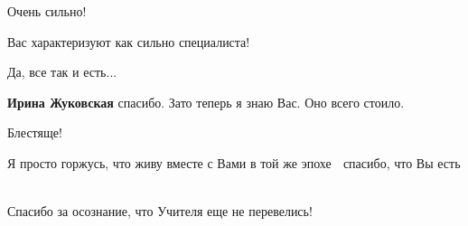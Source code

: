 \begin{itemize}

 
Очень сильно!

 
Вас характеризуют как сильно специалиста!

 
Да, все так и есть...

\begin{itemize}
 
\textbf{Ирина Жуковская} спасибо. Зато теперь я знаю Вас. Оно всего стоило.
\end{itemize}

 
Блестяще!

 

Я просто горжусь, что живу вместе с Вами в той же эпохе 🤍 спасибо, что Вы есть
🌱

Спасибо за осознание, что Учителя еще не перевелись!


\end{itemize}
